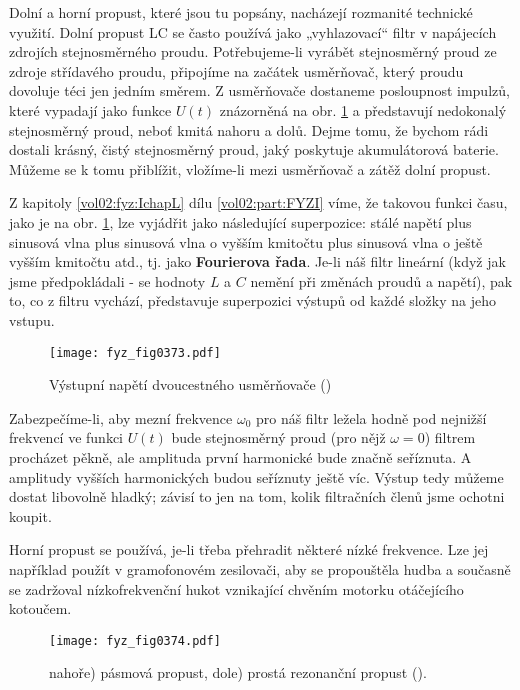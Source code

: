   Dolní a horní propust, které jsou tu popsány, nacházejí rozmanité technické využití. Dolní 
  propust LC se často používá jako „vyhlazovací“ filtr v napájecích zdrojích stejnosměrného proudu. 
  Potřebujeme-li vyrábět stejnosměrný proud ze zdroje střídavého proudu, připojíme na začátek 
  usměrňovač, který proudu dovoluje téci jen jedním směrem. Z usměrňovače dostaneme posloupnost 
  impulzů, které vypadají jako funkce \(U(t)\) znázorněná na obr. \ref{fyz:fig0373} a představují 
  nedokonalý stejnosměrný proud, neboť kmitá nahoru a dolů. Dejme tomu, že bychom rádi dostali 
  krásný, čistý stejnosměrný proud, jaký poskytuje akumulátorová baterie. Můžeme se k tomu 
  přiblížit, vložíme-li mezi usměrňovač a zátěž dolní propust. 
  
  Z kapitoly \ref{vol02:fyz:IchapL} dílu \ref{vol02:part:FYZI} víme, že takovou funkci času, jako je na obr. 
  \ref{fyz:fig0373}, lze vyjádřit jako následující superpozice: stálé napětí plus sinusová vlna plus 
  sinusová vlna o vyšším kmitočtu plus sinusová vlna o ještě vyšším kmitočtu atd., tj. jako 
  \textbf{Fourierova řada}. Je-li náš filtr lineární (když jak jsme předpokládali - se hodnoty 
  \(L\) a \(C\) nemění při změnách proudů a napětí), pak to, co z filtru vychází, představuje 
  superpozici výstupů od každé složky na jeho vstupu.
  
  \begin{figure}[ht!] %
    \centering
    \texttt{[image: fyz\_fig0373.pdf]}
    \caption{Výstupní napětí dvoucestného usměrňovače
             (\cite[s.~412]{Feynman02})}
    \label{fyz:fig0373}
  \end{figure}
  
  Zabezpečíme-li, aby mezní frekvence \(\omega_0\) pro náš filtr ležela hodně pod nejnižší 
  frekvencí ve funkci \(U(t)\) bude stejnosměrný proud (pro nějž \(\omega = 0\)) filtrem procházet 
  pěkně, ale amplituda první harmonické bude značně seříznuta. A amplitudy vyšších harmonických 
  budou seříznuty ještě víc. Výstup tedy můžeme dostat libovolně hladký; závisí to jen na tom, 
  kolik filtračních členů jsme ochotni koupit.
  
  Horní propust se používá, je-li třeba přehradit některé nízké frekvence. Lze jej například použít 
  v gramofonovém zesilovači, aby se propouštěla hudba a současně se zadržoval nízkofrekvenční hukot 
  vznikající chvěním motorku otáčejícího kotoučem.
  
  \begin{figure}[ht!] %
    \centering
    \texttt{[image: fyz\_fig0374.pdf]}
    \caption{nahoře) pásmová propust, dole) prostá rezonanční propust
             (\cite[s.~412]{Feynman02}).}
    \label{fyz:fig0374}
  \end{figure}
  
